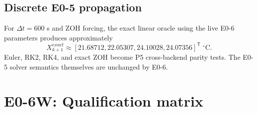 \documentclass[11pt]{article}
\begin{document}
\subsection{Discrete E0-5 propagation}
For $\Delta t=600$ s and ZOH forcing, the exact linear oracle using the live
E0-6 parameters produces approximately
\[
\boxed{
X_{k+1}^{exact}\approx
[21.68712,22.05307,24.10028,24.07356]^{\mathsf T}\;^\circ\mathrm C.
}
\]
Euler, RK2, RK4, and exact ZOH become P5 cross-backend parity tests. The E0-5
solver semantics themselves are unchanged by E0-6.

\section{E0-6W: Qualification matrix}
\end{document}
